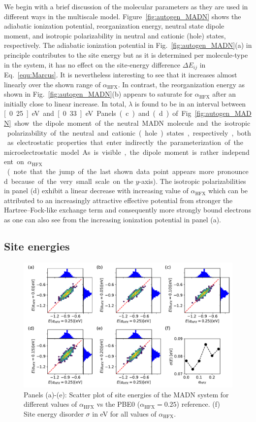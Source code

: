 \documentclass[%
 reprint,
superscriptaddress,
 amsmath,amssymb,
 aps,
prb,
floatfix
]{revtex4-2}
\newcommand{\ahfx}{\ensuremath{\alpha_\text{HFX}}\xspace}
\begin{document}
We begin with a brief discussion of the molecular parameters as they are used in different ways in the multiscale model. Figure~\ref{fig:autogen_MADN} shows the adiabatic ionization potential, reorganization energy, neutral state dipole moment, and isotropic polarizability in neutral and cationic (hole) states, respectively. The adiabatic ionization potential in Fig.~\ref{fig:autogen_MADN}(a) in principle contributes to the site energy but as it is determined per molecule-type in the system, it has no effect on the site-energy difference $\Delta E_{ij}$ in Eq.~\ref{equ:Marcus}. It is nevertheless interesting to see that it increases almost linearly over the shown range of \ahfx. In contrast, the reorganization energy as shown in Fig.~\ref{fig:autogen_MADN}(b) appears to saturate for \ahfx after an initially close to linear increase. In total, $\lambda$ is found to be in an interval between \unit[0.25]{eV} and \unit[0.33]{eV}. Panels (c) and (d) of Fig.~\ref{fig:autogen_MADN} show the dipole moment of the neutral MADN molecule and the isotropic polarizability of the neutral and cationic (hole) states, respectively, both as electrostatic properties that enter indirectly the parameterization of the microelectrostatic model. As is visible, the dipole moment is rather independent on \ahfx (note that the jump of the last shown data point appears more pronounced because of the very small scale on the $y$-axis). The isotropic polarizabilities in panel (d) exhibit a linear decrease with increasing value of \ahfx which can be attributed to an increasingly attractive effective potential from stronger the Hartree--Fock-like exchange term and consequently more strongly bound electrons as one can also see from the increasing ionization potential in panel (a).  

\subsection{Site energies}

\begin{figure}[tbp]
  \centering
  \includegraphics[width=\linewidth]{figs/scatterE_qmmm.pdf}
  \caption{Panels (a)-(e): Scatter plot of site energies of the MADN system for different values of \ahfx vs the PBE0 ($\ahfx=0.25$) reference. (f) Site energy disorder $\sigma$ in \unit[]{eV} for all values of \ahfx.}
  \label{fig:E_qmmm_MADN}
\end{figure}
\end{document}
